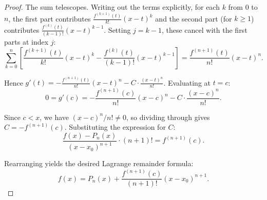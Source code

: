 \begin{proof}
    The sum telescopes. Writing out the terms explicitly, for each $k$ from $0$ to $n$, the first part contributes $\frac{f^{(k+1)}(t)}{k!}(x-t)^k$ and the second part (for $k \geq 1$) contributes $\frac{f^{(k)}(t)}{(k-1)!}(x-t)^{k-1}$. Setting $j = k-1$, these cancel with the first parts at index $j$:
    $$\sum_{k=0}^n \left[\frac{f^{(k+1)}(t)}{k!}(x-t)^k - \frac{f^{(k)}(t)}{(k-1)!}(x-t)^{k-1}\right] = \frac{f^{(n+1)}(t)}{n!}(x-t)^n.$$

    Hence $g'(t) = -\frac{f^{(n+1)}(t)}{n!}(x-t)^n - C \cdot \frac{(x-t)^n}{n!}$. Evaluating at $t = c$:
    $$0 = g'(c) = -\frac{f^{(n+1)}(c)}{n!}(x-c)^n - C \cdot \frac{(x-c)^n}{n!}.$$

    Since $c < x$, we have $(x-c)^n/n! \neq 0$, so dividing through gives $C = -f^{(n+1)}(c)$. Substituting the expression for $C$:
    $$\frac{f(x) - P_n(x)}{(x-x_0)^{n+1}} \cdot (n+1)! = f^{(n+1)}(c).$$

    Rearranging yields the desired Lagrange remainder formula:
    $$f(x) = P_n(x) + \frac{f^{(n+1)}(c)}{(n+1)!}(x-x_0)^{n+1}.$$
\end{proof}
